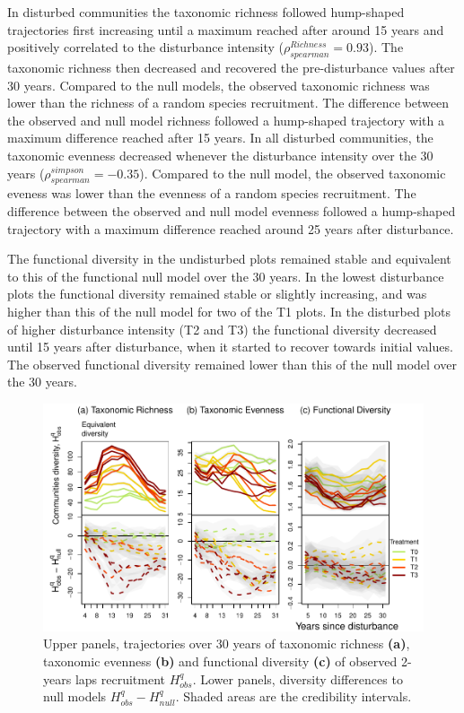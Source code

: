 \documentclass[fleqn,10pt]{ArtEcoFoG} %
\begin{document}
In disturbed communities the taxonomic richness followed hump-shaped
trajectories first increasing until a maximum reached after around 15
years and positively correlated to the disturbance intensity
(\(\rho^{Richness}_{spearman}=0.93\)). The taxonomic richness then
decreased and recovered the pre-disturbance values after 30 years.
Compared to the null models, the observed taxonomic richness was lower
than the richness of a random species recruitment. The difference
between the observed and null model richness followed a hump-shaped
trajectory with a maximum difference reached after 15 years. In all
disturbed communities, the taxonomic evenness decreased whenever the
disturbance intensity over the 30 years
(\(\rho^{simpson}_{spearman}=-0.35\)). Compared to the null model, the
observed taxonomic eveness was lower than the evenness of a random
species recruitment. The difference between the observed and null model
evenness followed a hump-shaped trajectory with a maximum difference
reached around 25 years after disturbance.

The functional diversity in the undisturbed plots remained stable and
equivalent to this of the functional null model over the 30 years. In
the lowest disturbance plots the functional diversity remained stable or
slightly increasing, and was higher than this of the null model for two
of the T1 plots. In the disturbed plots of higher disturbance intensity
(T2 and T3) the functional diversity decreased until 15 years after
disturbance, when it started to recover towards initial values. The
observed functional diversity remained lower than this of the null model
over the 30 years.

\begin{figure}

{\centering \includegraphics{RecruitmentTrajectories_files/figure-latex/DivTraj-1} 

}

\caption{Upper panels, trajectories over 30 years of taxonomic richness \textbf{(a)}, taxonomic evenness \textbf{(b)} and functional diversity \textbf{(c)} of observed 2-years laps recruitment $H_{obs}^q$. Lower panels, diversity differences to null models $H_{obs}^q - H_{null}^q$. Shaded areas are the credibility intervals.}\label{fig:DivTraj}
\end{figure}
\end{document}
